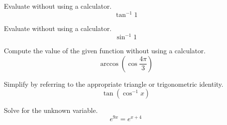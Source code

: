 \documentclass[12pt,addpoints, answers, fleqn]{exam}
\begin{document}
\begin{teacher}
\begin{questions}



\question 	%

Evaluate without using a calculator.
\[
\tan^{-1} 1
\]


\begin{solution}
\end{solution}

\question 	%

Evaluate without using a calculator.
\[
\sin^{-1} 1
\]

\begin{solution}
\end{solution}

\question 	%

Compute the value of the given function without using a calculator.
\[
\arccos \left( \cos \frac{4\pi}{3} \right)
\]


\begin{solution}
\end{solution}

\question 	%


Simplify by referring to the appropriate triangle or trigonometric identity.
\[
\tan \left( \cos^{-1} x \right)
\]

\begin{solution}
\end{solution}

\question 	%


Solve for the unknown variable.
\[
e^{9x} = e^{x + 4}
\]
\begin{solution}
\end{solution}

\question 	%


\end{questions}
\end{teacher}
\end{document}
